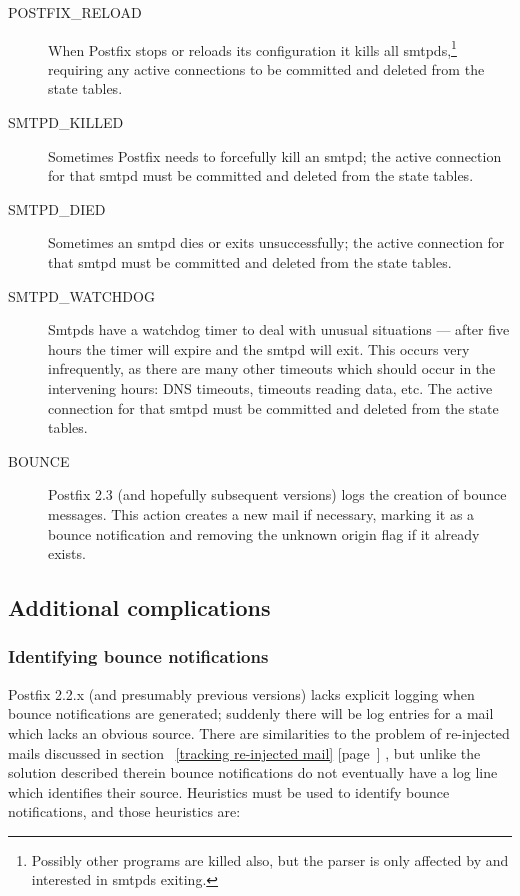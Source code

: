 \documentclass[a4paper,12pt,draft]{article}
\newcommand{\refwithpage}[1]{%
    \empty{}\ref{#1} [page~\pageref{#1}]%
}
\begin{document}
\begin{description}
    \item [POSTFIX\_RELOAD] When Postfix stops or reloads its configuration
        it kills all smtpds,\footnote{Possibly other programs are killed
        also, but the parser is only affected by and interested in smtpds
        exiting.} requiring any active connections to be committed and
        deleted from the state tables.

    \item [SMTPD\_KILLED] Sometimes Postfix needs to forcefully kill an
        smtpd; the active connection for that smtpd must be committed and
        deleted from the state tables.

    \item [SMTPD\_DIED] Sometimes an smtpd dies or exits unsuccessfully;
        the active connection for that smtpd must be committed and deleted
        from the state tables.

    \item [SMTPD\_WATCHDOG] Smtpds have a watchdog timer to deal with
        unusual situations --- after five hours the timer will expire and
        the smtpd will exit.  This occurs very infrequently, as there are
        many other timeouts which should occur in the intervening hours:
        DNS timeouts, timeouts reading data, etc.  The active connection
        for that smtpd must be committed and deleted from the state tables.

    \item [BOUNCE] Postfix 2.3 (and hopefully subsequent versions) logs the
        creation of bounce messages.  This action creates a new mail if
        necessary, marking it as a bounce notification and removing the
        unknown origin flag if it already exists.

\end{description}

\subsection{Additional complications}

\label{additional complications}

\subsubsection{Identifying bounce notifications}

\label{identifying-bounce-notifications}

Postfix 2.2.x (and presumably previous versions) lacks explicit logging
when bounce notifications are generated; suddenly there will be log entries
for a mail which lacks an obvious source.  There are similarities to the
problem of re-injected mails discussed in section~\refwithpage{tracking
re-injected mail}, but unlike the solution described therein bounce
notifications do not eventually have a log line which identifies their
source.  Heuristics must be used to identify bounce notifications, and
those heuristics are:
\end{document}
